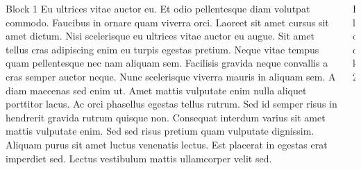\documentclass[final,dvipdfmx,t]{beamer}
\begin{document}
\begin{frame}
\begin{columns}
\begin{column}{0.485\textwidth}
\begin{block}{Block 1}
Eu ultrices vitae auctor eu. Et odio pellentesque diam volutpat commodo. Faucibus in ornare quam viverra orci. Laoreet sit amet cursus sit amet dictum. Nisi scelerisque eu ultrices vitae auctor eu augue. Sit amet tellus cras adipiscing enim eu turpis egestas pretium. Neque vitae tempus quam pellentesque nec nam aliquam sem. Facilisis gravida neque convallis a cras semper auctor neque. Nunc scelerisque viverra mauris in aliquam sem. A diam maecenas sed enim ut. Amet mattis vulputate enim nulla aliquet porttitor lacus. Ac orci phasellus egestas tellus rutrum. Sed id semper risus in hendrerit gravida rutrum quisque non. Consequat interdum varius sit amet mattis vulputate enim. Sed sed risus pretium quam vulputate dignissim. Aliquam purus sit amet luctus venenatis lectus. Est placerat in egestas erat imperdiet sed. Lectus vestibulum mattis ullamcorper velit sed.
			\end{block}
		\end{column}
		\begin{column}{0.485\textwidth}
			\begin{block}{Block 2}
				\begin{enumerate}
					\item poi
					\item poi
					\item poi
					\item poi
				\end{enumerate}
			\end{block}
		\end{column}
	\end{columns}
\end{frame}
\end{document}
